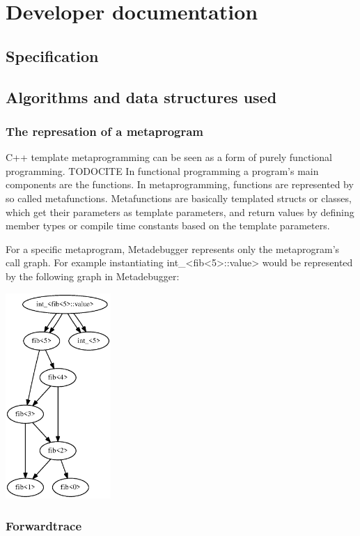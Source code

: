 
\chapter{Developer documentation}

\section{Specification}

\section{Algorithms and data structures used}

\subsection*{The represation of a metaprogram}

C++ template metaprogramming can be seen as a form of purely functional
programming. TODOCITE In functional programming a program's main components
are the functions. In metaprogramming, functions are represented by so called
metafunctions. Metafunctions are basically templated structs or classes, which
get their parameters as template parameters, and return values by defining
member types or compile time constants based on the template parameters.

For a specific metaprogram, Metadebugger represents only the metaprogram's call
graph. For example instantiating int_<fib<5>::value> would be represented by
the following graph in Metadebugger:

\includegraphics[width=0.3\textwidth]{img/fib5_call_graph.eps}

\subsection*{Forwardtrace}

